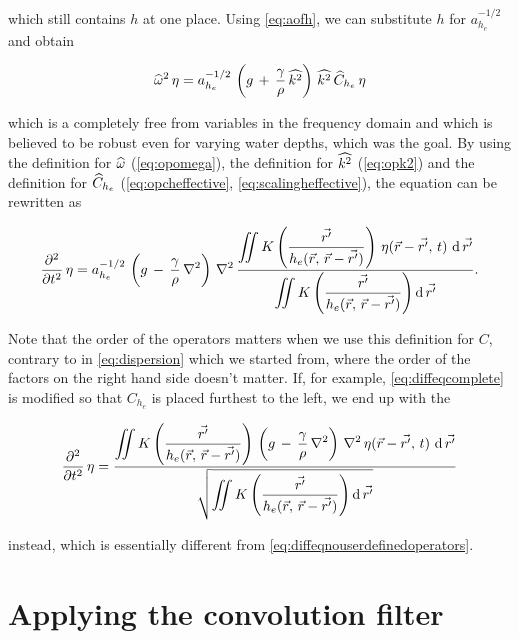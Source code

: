 which still contains $h$ at one place. Using \eqref{eq:aofh}, we can substitute $h$ for $a_{h_e}^{-1/2}$ and obtain

\begin{equation} \label{eq:diffeqcomplete}
\widehat{\omega}^2\,\eta = a_{h_e}^{-1/2}\,\left(g\,+\,\frac{\gamma}{\rho}\,\widehat{k^2}\right)\,\widehat{k^2}\,\widehat{C}_{h_e}\,\eta
\end{equation}

which is a \PDE completely free from variables in the frequency domain and which is believed to be robust even for varying water depths, which was the goal. By using the definition for $\widehat{\omega}$ (\eqref{eq:opomega}), the definition for $\widehat{k^2}$ (\eqref{eq:opk2}) and the definition for $\widehat{C}_{h_e}$ (\eqref{eq:opcheffective}, \eqref{eq:scalingheffective}), the equation can be rewritten as

\begin{equation} \label{eq:diffeqnouserdefinedoperators}
\frac{\partial^2}{\partial t^2}\,\eta = a_{h_e}^{-1/2}\,\left(g\,-\,\frac{\gamma}{\rho}\,\nabla^2\right)\,\nabla^2\,\frac{\displaystyle\iint K\left(\frac{\vec{r'}}{h_e(\vec{r},\,\vec{r}-\vec{r'})}\right)\,\eta(\vec{r}-\vec{r'},\,t)\,\opd\vec{r'}}{\displaystyle\iint K\left(\frac{\vec{r'}}{h_e(\vec{r},\,\vec{r}-\vec{r'})}\right) \opd\vec{r'}}.
\end{equation}

Note that the order of the operators matters when we use this definition for $C$, contrary to in \eqref{eq:dispersion} which we started from, where the order of the factors on the right hand side doesn't matter. If, for example, \eqref{eq:diffeqcomplete} is modified so that $C_{h_e}$ is placed furthest to the left, we end up with the \PDE

\begin{equation} \label{eq:diffeqnouserdefinedoperatorsvariant}
\frac{\partial^2}{\partial t^2}\,\eta = \frac{\displaystyle\iint K\left(\frac{\vec{r'}}{h_e(\vec{r},\,\vec{r}-\vec{r'})}\right)\,\left(g\,-\,\frac{\gamma}{\rho}\,\nabla^2\right)\,\nabla^2\,\eta(\vec{r}-\vec{r'},\,t)\,\opd\vec{r'}}{\sqrt{\displaystyle\iint K\left(\frac{\vec{r'}}{h_e(\vec{r},\,\vec{r}-\vec{r'})}\right) \opd\vec{r'}}}
\end{equation}

instead, which is essentially different from \eqref{eq:diffeqnouserdefinedoperators}.

\section{Applying the convolution filter}

